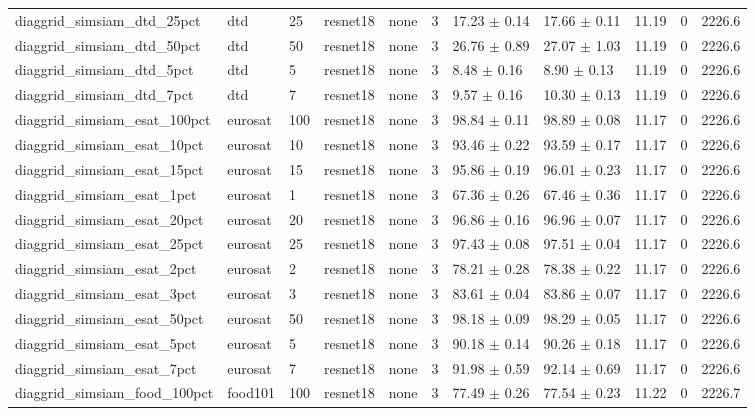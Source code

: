 \begin{tabular}{lllllllllll}
diaggrid_simsiam_dtd_25pct & dtd & 25 & resnet18 & none & 3 & 17.23 $\pm$ 0.14 & 17.66 $\pm$ 0.11 & 11.19 & 0 & 2226.6 \\
diaggrid_simsiam_dtd_50pct & dtd & 50 & resnet18 & none & 3 & 26.76 $\pm$ 0.89 & 27.07 $\pm$ 1.03 & 11.19 & 0 & 2226.6 \\
diaggrid_simsiam_dtd_5pct & dtd & 5 & resnet18 & none & 3 & 8.48 $\pm$ 0.16 & 8.90 $\pm$ 0.13 & 11.19 & 0 & 2226.6 \\
diaggrid_simsiam_dtd_7pct & dtd & 7 & resnet18 & none & 3 & 9.57 $\pm$ 0.16 & 10.30 $\pm$ 0.13 & 11.19 & 0 & 2226.6 \\
diaggrid_simsiam_esat_100pct & eurosat & 100 & resnet18 & none & 3 & 98.84 $\pm$ 0.11 & 98.89 $\pm$ 0.08 & 11.17 & 0 & 2226.6 \\
diaggrid_simsiam_esat_10pct & eurosat & 10 & resnet18 & none & 3 & 93.46 $\pm$ 0.22 & 93.59 $\pm$ 0.17 & 11.17 & 0 & 2226.6 \\
diaggrid_simsiam_esat_15pct & eurosat & 15 & resnet18 & none & 3 & 95.86 $\pm$ 0.19 & 96.01 $\pm$ 0.23 & 11.17 & 0 & 2226.6 \\
diaggrid_simsiam_esat_1pct & eurosat & 1 & resnet18 & none & 3 & 67.36 $\pm$ 0.26 & 67.46 $\pm$ 0.36 & 11.17 & 0 & 2226.6 \\
diaggrid_simsiam_esat_20pct & eurosat & 20 & resnet18 & none & 3 & 96.86 $\pm$ 0.16 & 96.96 $\pm$ 0.07 & 11.17 & 0 & 2226.6 \\
diaggrid_simsiam_esat_25pct & eurosat & 25 & resnet18 & none & 3 & 97.43 $\pm$ 0.08 & 97.51 $\pm$ 0.04 & 11.17 & 0 & 2226.6 \\
diaggrid_simsiam_esat_2pct & eurosat & 2 & resnet18 & none & 3 & 78.21 $\pm$ 0.28 & 78.38 $\pm$ 0.22 & 11.17 & 0 & 2226.6 \\
diaggrid_simsiam_esat_3pct & eurosat & 3 & resnet18 & none & 3 & 83.61 $\pm$ 0.04 & 83.86 $\pm$ 0.07 & 11.17 & 0 & 2226.6 \\
diaggrid_simsiam_esat_50pct & eurosat & 50 & resnet18 & none & 3 & 98.18 $\pm$ 0.09 & 98.29 $\pm$ 0.05 & 11.17 & 0 & 2226.6 \\
diaggrid_simsiam_esat_5pct & eurosat & 5 & resnet18 & none & 3 & 90.18 $\pm$ 0.14 & 90.26 $\pm$ 0.18 & 11.17 & 0 & 2226.6 \\
diaggrid_simsiam_esat_7pct & eurosat & 7 & resnet18 & none & 3 & 91.98 $\pm$ 0.59 & 92.14 $\pm$ 0.69 & 11.17 & 0 & 2226.6 \\
diaggrid_simsiam_food_100pct & food101 & 100 & resnet18 & none & 3 & 77.49 $\pm$ 0.26 & 77.54 $\pm$ 0.23 & 11.22 & 0 & 2226.7 \\

\end{tabular}
